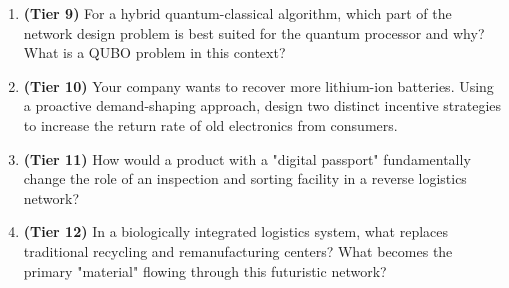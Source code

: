 \documentclass{article}
\begin{document}
\begin{enumerate}[label=\textbf{Q\arabic*:}, wide, labelindent=0pt]
    \item \textbf{(Tier 9)} For a hybrid quantum-classical algorithm, which part of the network design problem is best suited for the quantum processor and why? What is a QUBO problem in this context?
    \item \textbf{(Tier 10)} Your company wants to recover more lithium-ion batteries. Using a proactive demand-shaping approach, design two distinct incentive strategies to increase the return rate of old electronics from consumers.
    \item \textbf{(Tier 11)} How would a product with a "digital passport" fundamentally change the role of an inspection and sorting facility in a reverse logistics network?
    \item \textbf{(Tier 12)} In a biologically integrated logistics system, what replaces traditional recycling and remanufacturing centers? What becomes the primary "material" flowing through this futuristic network?
\end{enumerate}
\end{document}
